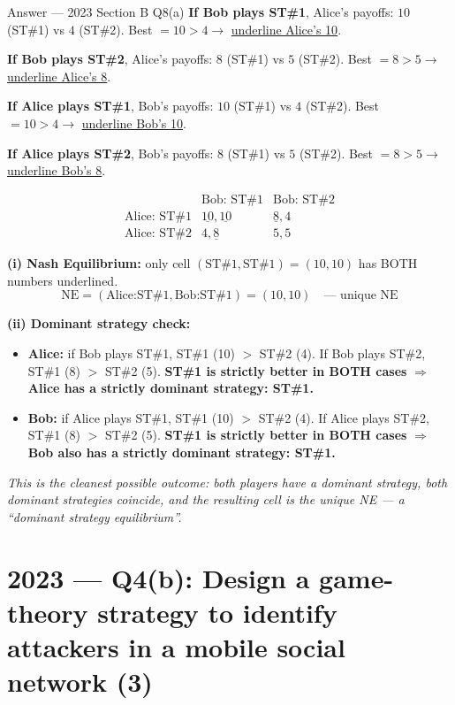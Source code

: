 \documentclass[12pt,a4paper]{article}
\begin{document}
\begin{solbox}{Answer --- 2023 Section B Q8(a)}
\textbf{If Bob plays ST\#1}, Alice's payoffs: $10$ (ST\#1) vs $4$ (ST\#2). Best $=10>4 \to$ \underline{underline Alice's 10}.

\textbf{If Bob plays ST\#2}, Alice's payoffs: $8$ (ST\#1) vs $5$ (ST\#2). Best $=8>5 \to$ \underline{underline Alice's 8}.

\textbf{If Alice plays ST\#1}, Bob's payoffs: $10$ (ST\#1) vs $4$ (ST\#2). Best $=10>4 \to$ \underline{underline Bob's 10}.

\textbf{If Alice plays ST\#2}, Bob's payoffs: $8$ (ST\#1) vs $5$ (ST\#2). Best $=8>5 \to$ \underline{underline Bob's 8}.

\[
\begin{array}{c|cc}
 & \text{Bob: ST\#1} & \text{Bob: ST\#2} \\\hline
\text{Alice: ST\#1} & \underline{10},\underline{10} & \underline{8},4 \\
\text{Alice: ST\#2} & 4,\underline{8} & 5,5
\end{array}
\]

\textbf{(i) Nash Equilibrium:} only cell $(\text{ST\#1},\text{ST\#1})=(10,10)$ has BOTH numbers underlined.
\[
\boxed{\text{NE}=(\text{Alice:ST\#1},\text{Bob:ST\#1})=(10,10)} \quad \text{--- unique NE}
\]

\textbf{(ii) Dominant strategy check:}
\begin{itemize}[noitemsep]
  \item \textbf{Alice:} if Bob plays ST\#1, ST\#1 (10) $>$ ST\#2 (4). If Bob plays ST\#2, ST\#1 (8) $>$ ST\#2 (5). \textbf{ST\#1 is strictly better in BOTH cases} $\Rightarrow$ \textbf{Alice has a strictly dominant strategy: ST\#1.}
  \item \textbf{Bob:} if Alice plays ST\#1, ST\#1 (10) $>$ ST\#2 (4). If Alice plays ST\#2, ST\#1 (8) $>$ ST\#2 (5). \textbf{ST\#1 is strictly better in BOTH cases} $\Rightarrow$ \textbf{Bob also has a strictly dominant strategy: ST\#1.}
\end{itemize}
\textit{This is the cleanest possible outcome: both players have a dominant strategy, both dominant strategies coincide, and the resulting cell is the unique NE --- a ``dominant strategy equilibrium''.}
\end{solbox}

\section{2023 --- Q4(b): Design a game-theory strategy to identify attackers in a mobile social network (3)}
\end{document}
